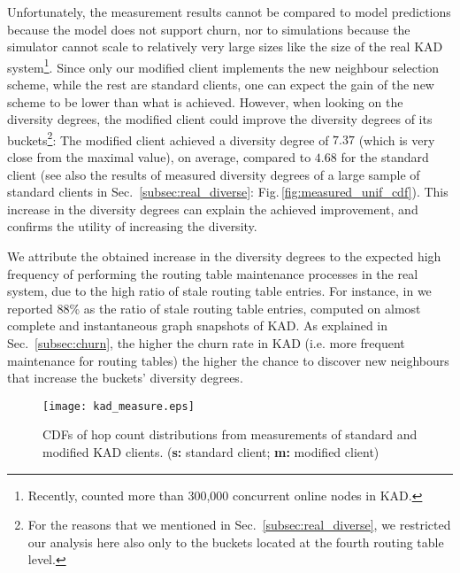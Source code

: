 \documentclass[10pt, conference, compsocconf, letterpaper]{IEEEtran}
\begin{document}
Unfortunately, the measurement results cannot be compared to model predictions because the model does not support churn, nor to simulations because the simulator cannot scale to relatively very large sizes like the size of the real KAD system\footnote{Recently, \cite{salah13capturing} counted more than 300,000 concurrent online nodes in KAD.}. Since only our modified client implements the new neighbour selection scheme, while the rest are standard clients, one can expect the gain of the new scheme to be lower than what is achieved. However, when looking on the diversity degrees, the modified client could improve the diversity degrees of its buckets\footnote{For the reasons that we mentioned in Sec.~\ref{subsec:real_diverse}, we restricted our analysis here also only to the buckets located at the fourth routing table level.}: The modified client achieved a diversity degree of $7.37$ (which is very close from the maximal value), on average, compared to $4.68$ for the standard client (see also the results of measured diversity degrees of a large sample of standard clients in Sec.~\ref{subsec:real_diverse}: Fig.\,\ref{fig:measured_unif_cdf}). This increase in the diversity degrees can explain the achieved improvement, and confirms the utility of increasing the diversity. 

We attribute the obtained increase in the diversity degrees to the expected high frequency of performing the routing table maintenance processes in the real system, due to the high ratio of stale routing table entries. For instance, in \cite{salah14characterizing} we reported 88\% as the ratio of stale routing table entries, computed on almost complete and instantaneous graph snapshots of KAD. As explained in Sec.~\ref{subsec:churn}, the higher the churn rate in KAD (i.e. more frequent maintenance for routing tables) the higher the chance to discover new neighbours that increase the buckets' diversity degrees. 





\begin{figure} \centering
\captionsetup{font=scriptsize}
      \texttt{[image: kad\_measure.eps]} 
   \caption{CDFs of hop count distributions from measurements of standard and modified KAD clients. (\textbf{s:} standard client; \textbf{m:} modified client)}
   \label{fig:all_hop_count_measure_dist}
\end{figure}
\end{document}
